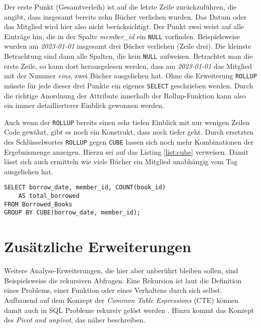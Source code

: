Der erste Punkt (Gesamtverleih) ist auf die letzte Zeile zurückzuführen, die angibt, dass
insgesamt bereits zehn Bücher verliehen wurden. Das Datum oder das Mitglied wird
hier also nicht berücksichtigt. Der Punkt zwei weist auf alle Einträge hin, die in
der Spalte \textit{member\_id} ein \texttt{NULL} vorfinden. Beispielsweise
wurden am \textit{2023-01-01} insgesamt drei Bücher verliehen (Zeile drei). Die
kleinste Betrachtung sind dann alle Spalten, die kein \texttt{NULL} aufweisen. Betrachtet
man die erste Zeile, so kann dort herausgelesen werden, dass am \textit{2023-01-01}
das Mitglied mit der Nummer \textit{eins}, zwei Bücher ausgeliehen hat. Ohne die
Erweiterung \texttt{ROLLUP} müsste für jede dieser drei Punkte ein eigenes
\texttt{SELECT} geschrieben werden. Durch die richtige Anordnung der Attribute
innerhalb der Rollup-Funktion kann also ein immer detaillierterer Einblick
gewonnen werden.

Auch wenn der \texttt{ROLLUP} bereits einen sehr tiefen Einblick mit nur wenigen
Zeilen Code gewährt, gibt es noch ein Konstrukt, dass noch tiefer geht. Durch
ersetzten des Schlüsselwortes \texttt{ROLLUP} gegen \texttt{CUBE} lassen sich
noch mehr Kombinationen der Ergebnismenge anzeigen. Hierzu sei auf das Listing \ref{list:cube}
verweisen. Damit lässt sich auch ermitteln wie viele Bücher ein Mitglied
unabhängig vom Tag ausgeliehen hat.

\begin{lstlisting}[label={list:cube}]
SELECT borrow_date, member_id, COUNT(book_id)
	AS total_borrowed
FROM Borrowed_Books
GROUP BY CUBE(borrow_date, member_id);
\end{lstlisting}

\section{Zusätzliche Erweiterungen}
\label{sec:zus_erweiterungen} Weitere Analyse-Erweiterungen, die hier aber
unberührt bleiben sollen, sind Beispielsweise die rekursiven Abfragen. Eine
Rekursion ist laut \citet{benecke1998rekursion} die Definition eines Problems,
einer Funktion oder eines Verhaltens durch sich selbst. Aufbauend auf dem Konzept
der \textit{Common Table Espressions} (CTE) können damit auch in SQL Probleme
rekursiv gelöst werden \citep[vgl.][]{Ignacio2022}. Hinzu kommt das Konzept des
\textit{Pivot and unpivot}, das \citet{Nuijten2023} näher beschreiben.